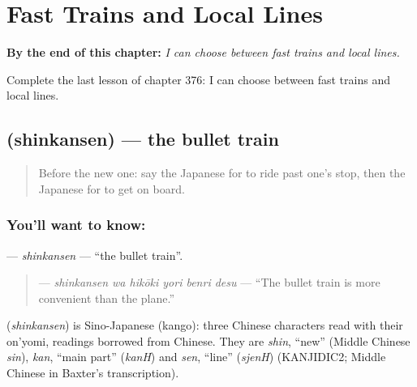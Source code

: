 
\chapter{Fast Trains and Local Lines}
\label{ch:ja-fast-trains-and-local-lines}

\begin{chapteropening}
\textbf{By the end of this chapter:} \emph{I can choose between fast trains and local lines.}

Complete the last lesson of chapter 376: I can choose between fast trains and local lines.
\end{chapteropening}

\section[\texorpdfstring{\ja{しんかんせん} (shinkansen)}{しんかんせん (shinkansen)}]{ (shinkansen) — the bullet train}

\label{lesson:JA-C376-shinkansen}



\begin{quote}
Before the new one: say the Japanese for to ride past one's stop, then the Japanese for to get on board.
\end{quote}

\subsection*{You'll want to know: }
\textbf{} — \emph{shinkansen} — \textquotedblleft{}the bullet train\textquotedblright{}.

\begin{quote}
\textbf{  } — \emph{shinkansen wa hikōki yori benri desu} — \textquotedblleft{}The bullet train is more convenient than the plane.\textquotedblright{}
\end{quote}

\begin{cousinweb}
\textbf{} (\emph{shinkansen}) is Sino-Japanese (kango): three Chinese characters read with their on'yomi, readings borrowed from Chinese. They are \emph{shin}, \textquotedblleft{}new\textquotedblright{} (Middle Chinese \emph{sin}), \emph{kan}, \textquotedblleft{}main part\textquotedblright{} (\emph{kanH}) and \emph{sen}, \textquotedblleft{}line\textquotedblright{} (\emph{sjenH}) (KANJIDIC2; Middle Chinese in Baxter's transcription).
\end{cousinweb}

